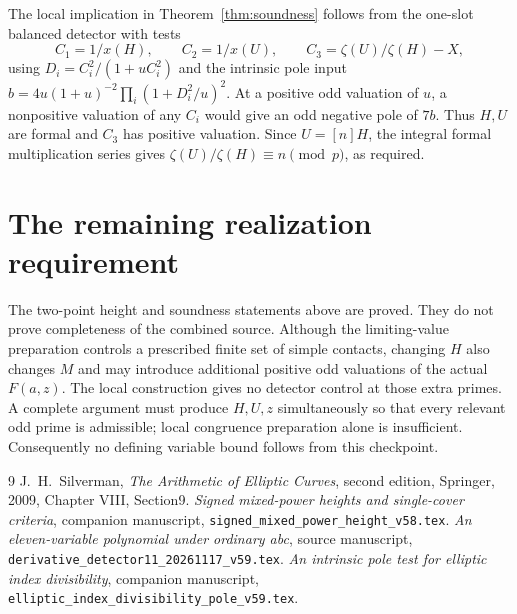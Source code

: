\documentclass[11pt,a4paper]{article}
\begin{document}
The local implication in Theorem~\ref{thm:soundness} follows from
the one-slot balanced detector with tests
\[
 C_1=1/x(H),\qquad C_2=1/x(U),\qquad
 C_3=\zeta(U)/\zeta(H)-X,
\]
using $D_i=C_i^2/(1+uC_i^2)$ and the intrinsic pole input
$b=4u(1+u)^{-2}\prod_i(1+D_i^2/u)^2$.
At a positive odd valuation of $u$, a nonpositive valuation of
any $C_i$ would give an odd negative pole of $7b$. Thus $H,U$
are formal and $C_3$ has positive valuation. Since $U=[n]H$,
the integral formal multiplication series gives
$\zeta(U)/\zeta(H)\equiv n\pmod p$, as required.

\section{The remaining realization requirement}

The two-point height and soundness statements above are proved.
They do not prove completeness of the combined source. Although
the limiting-value preparation controls a prescribed finite set
of simple contacts, changing $H$ also changes $M$ and may introduce
additional positive odd valuations of the actual $F(a,z)$.
The local construction gives no detector control at those extra
primes. A complete argument must produce $H,U,z$ simultaneously
so that every relevant odd prime is admissible; local congruence
preparation alone is insufficient. Consequently no defining
variable bound follows from this checkpoint.

\begin{thebibliography}{9}
J.~H.~Silverman, \emph{The Arithmetic of Elliptic Curves},
second edition, Springer, 2009, Chapter VIII, Section9.
\emph{Signed mixed-power heights and single-cover
criteria}, companion manuscript,
\nolinkurl{signed_mixed_power_height_v58.tex}.
\emph{An eleven-variable polynomial under
ordinary abc}, source manuscript,
\nolinkurl{derivative_detector11_20261117_v59.tex}.
\emph{An intrinsic pole test for elliptic index
divisibility}, companion manuscript,
\nolinkurl{elliptic_index_divisibility_pole_v59.tex}.
\end{thebibliography}
\end{document}

